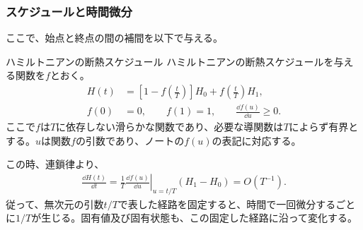 \documentclass[a4paper,10.5pt]{article}
\numberwithin{equation}{section}
\begin{document}
\subsubsection{スケジュールと時間微分}
ここで、始点と終点の間の補間を以下で与える。
\begin{setupbox}{ハミルトニアンの断熱スケジュール}
ハミルトニアンの断熱スケジュールを与える関数を$f$とおく。
\begin{align}
H(t)&=\left[1-f\left(\frac tT\right)\right]H_0
+f\left(\frac tT\right)H_1,\\
f(0)&=0,\qquad f(1)=1,\qquad
\frac{\dd f(u)}{\dd u}\geq0.
\end{align}
ここで$f$は$T$に依存しない滑らかな関数であり、必要な導関数は$T$によらず有界とする。$u$は関数$f$の引数であり、ノートの$f(u)$の表記に対応する。
\end{setupbox}
この時、連鎖律より、
\begin{align}
\frac{\dd H(t)}{\dd t}
=\frac1T
\left.\frac{\dd f(u)}{\dd u}\right|_{u=t/T}
(H_1-H_0)
=O(T^{-1}).
\end{align}
従って、無次元の引数$t/T$で表した経路を固定すると、時間で一回微分するごとに$1/T$が生じる。固有値及び固有状態も、この固定した経路に沿って変化する。
\end{document}
